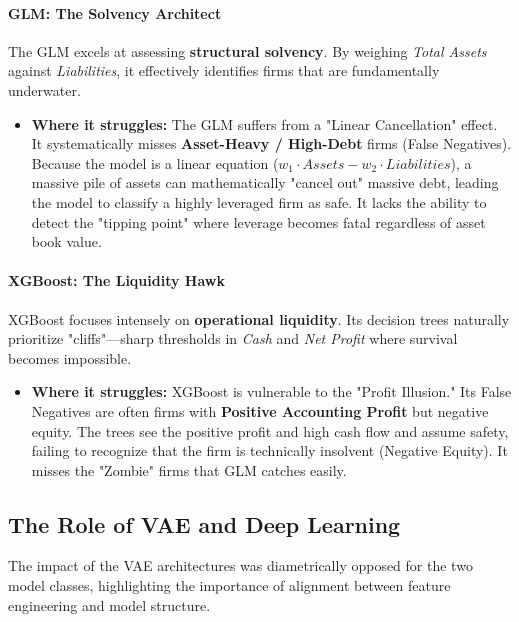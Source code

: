 \documentclass{report}\usepackage[]{graphicx}\usepackage[]{xcolor}
\begin{document}
\paragraph{GLM: The Solvency Architect}
The GLM excels at assessing \textbf{structural solvency}. By weighing \textit{Total Assets} against \textit{Liabilities}, it effectively identifies firms that are fundamentally underwater.
\begin{itemize}
    \item \textbf{Where it struggles:} The GLM suffers from a "Linear Cancellation" effect. It systematically misses \textbf{Asset-Heavy / High-Debt} firms (False Negatives). Because the model is a linear equation ($w_1 \cdot Assets - w_2 \cdot Liabilities$), a massive pile of assets can mathematically "cancel out" massive debt, leading the model to classify a highly leveraged firm as safe. It lacks the ability to detect the "tipping point" where leverage becomes fatal regardless of asset book value.
\end{itemize}

\paragraph{XGBoost: The Liquidity Hawk}
XGBoost focuses intensely on \textbf{operational liquidity}. Its decision trees naturally prioritize "cliffs"—sharp thresholds in \textit{Cash} and \textit{Net Profit} where survival becomes impossible.
\begin{itemize}
    \item \textbf{Where it struggles:} XGBoost is vulnerable to the "Profit Illusion." Its False Negatives are often firms with \textbf{Positive Accounting Profit} but negative equity. The trees see the positive profit and high cash flow and assume safety, failing to recognize that the firm is technically insolvent (Negative Equity). It misses the "Zombie" firms that GLM catches easily.
\end{itemize}

\subsection{The Role of VAE and Deep Learning}

The impact of the VAE architectures was diametrically opposed for the two model classes, highlighting the importance of alignment between feature engineering and model structure.
\end{document}
